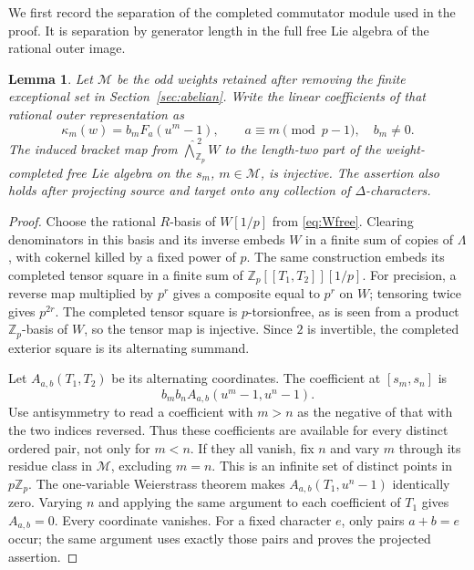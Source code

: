 \documentclass[11pt]{article}
\newtheorem{lemma}[theorem]{Lemma}
\theoremstyle{definition}\newtheorem{definition}[theorem]{Definition}
\begin{document}
We first record the separation of the completed commutator module
used in the proof.  It is separation by generator length in the
full free Lie algebra of the rational outer image.

\begin{lemma}\label{lem:class-two-moments}
Let $\mathcal M$ be the odd weights retained after removing the
finite exceptional set in Section~\ref{sec:abelian}.
Write the linear coefficients of that rational outer
representation as
\[
 \kappa_m(w)=b_m F_a(u^m-1),\qquad
 a\equiv m\pmod{p-1},\quad b_m\ne0.
\]
The induced bracket map from
$\widehat{\bigwedge}^{\,2}_{\mathbb Z_p}W$
to the length-two part of the weight-completed free Lie algebra
on the $s_m$, $m\in\mathcal M$, is injective.
The assertion also holds after projecting source and target onto
any collection of $\Delta$-characters.
\end{lemma}

\begin{proof}
Choose the rational $R$-basis of $W[1/p]$ from
\eqref{eq:Wfree}.  Clearing denominators in this basis and its
inverse embeds $W$ in a finite sum of copies of $\Lambda$,
with cokernel killed by a fixed power of $p$.
The same construction embeds its completed tensor square
in a finite sum of $\mathbb Z_p[[T_1,T_2]][1/p]$.
For precision, a reverse map multiplied by $p^r$ gives a
composite equal to $p^r$ on $W$; tensoring twice gives
$p^{2r}$.  The completed tensor square is $p$-torsionfree,
as is seen from a product $\mathbb Z_p$-basis of $W$, so
the tensor map is injective.  Since $2$ is invertible,
the completed exterior square is its alternating summand.

Let $A_{a,b}(T_1,T_2)$ be its alternating coordinates.
The coefficient at $[s_m,s_n]$ is
\[
             b_mb_n A_{a,b}(u^m-1,u^n-1).
\]
Use antisymmetry to read a coefficient with $m>n$ as the
negative of that with the two indices reversed.  Thus these
coefficients are available for every distinct ordered pair,
not only for $m<n$.
If they all vanish, fix $n$ and vary $m$ through its residue
class in $\mathcal M$, excluding $m=n$.  This is an infinite
set of distinct points in $p\mathbb Z_p$.
The one-variable Weierstrass theorem makes
$A_{a,b}(T_1,u^n-1)$ identically zero.  Varying $n$ and
applying the same argument to each coefficient of $T_1$
gives $A_{a,b}=0$.  Every coordinate vanishes.
For a fixed character $e$, only pairs $a+b=e$ occur;
the same argument uses exactly those pairs and proves
the projected assertion.
\end{proof}
\end{document}
